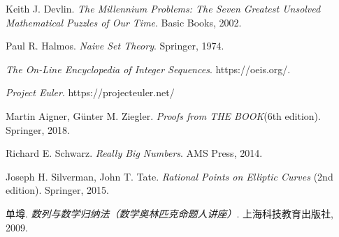 \begin{thebibliography}{}
 Keith J. Devlin. 
\textit{The Millennium Problems: The Seven Greatest Unsolved Mathematical Puzzles of Our Time}. Basic Books, 2002.

 Paul R. Halmos. 
\textit{Naive Set Theory}. Springer, 1974.

\textit{The On-Line Encyclopedia of Integer Sequences}. https://oeis.org/.

\textit{Project Euler}. https://projecteuler.net/

  Martin Aigner, Günter M. Ziegler. \textit{Proofs from THE BOOK}(6th edition). Springer, 2018. 

 Richard E. Schwarz.
\textit{Really Big Numbers}. AMS Press, 2014.

 Joseph H. Silverman, John T. Tate.
\textit{Rational Points on Elliptic Curves} (2nd edition). Springer, 2015.

 单{墫}.
\textit{数列与数学归纳法（数学奥林匹克命题人讲座）}. 上海科技教育出版社, 2009.

\end{thebibliography}